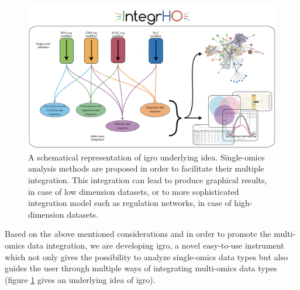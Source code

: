 
\begin{figure}[H]
\centering
\includegraphics[width=\textwidth, keepaspectratio]{img/integrho/integrho_scheme.pdf}
\caption[\gls{igro} representation]{A schematical representation of \gls{igro} underlying idea.
Single-omics analysis methods are proposed in order to facilitate their multiple integration.
This integration can lead to produce graphical results, in case of low dimension datasets, or to more sophisticated integration model such as regulation networks, in case of high-dimension datasets.}
\label{fig:integrhoidea}
\end{figure}

Based on the above mentioned considerations and in order to promote the multi-omics data integration, we are developing \gls{igro},  a novel easy-to-use instrument which not only gives the possibility to analyze single-omics data types but also guides the user through multiple ways of integrating multi-omics data types (figure \ref{fig:integrhoidea} gives an underlying idea of \gls{igro}).








